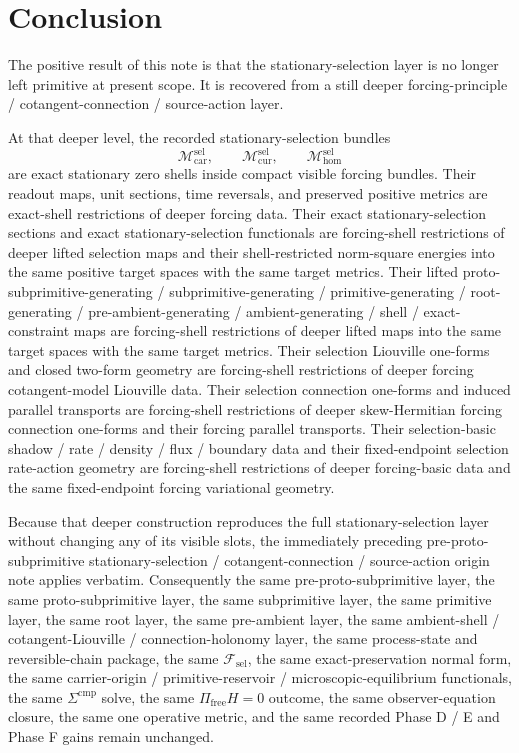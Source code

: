 \documentclass[11pt]{article}
\newcommand{\StemFunctional}{\mathscr F_{\mathrm{sel}}}
\newcommand{\Car}{\mathrm{car}}
\newcommand{\Cur}{\mathrm{cur}}
\newcommand{\Hom}{\mathrm{hom}}
\newcommand{\SelSpace}[1]{\mathcal M_{#1}^{\mathrm{sel}}}
\begin{document}
\section{Conclusion}

The positive result of this note is that the stationary-selection layer is no longer left primitive at present scope. It is recovered from a still deeper forcing-principle / cotangent-connection / source-action layer.

At that deeper level, the recorded stationary-selection bundles
\[
\SelSpace{\Car},\qquad
\SelSpace{\Cur},\qquad
\SelSpace{\Hom}
\]
are exact stationary zero shells inside compact visible forcing bundles. Their readout maps, unit sections, time reversals, and preserved positive metrics are exact-shell restrictions of deeper forcing data. Their exact stationary-selection sections and exact stationary-selection functionals are forcing-shell restrictions of deeper lifted selection maps and their shell-restricted norm-square energies into the same positive target spaces with the same target metrics. Their lifted proto-subprimitive-generating / subprimitive-generating / primitive-generating / root-generating / pre-ambient-generating / ambient-generating / shell / exact-constraint maps are forcing-shell restrictions of deeper lifted maps into the same target spaces with the same target metrics. Their selection Liouville one-forms and closed two-form geometry are forcing-shell restrictions of deeper forcing cotangent-model Liouville data. Their selection connection one-forms and induced parallel transports are forcing-shell restrictions of deeper skew-Hermitian forcing connection one-forms and their forcing parallel transports. Their selection-basic shadow / rate / density / flux / boundary data and their fixed-endpoint selection rate-action geometry are forcing-shell restrictions of deeper forcing-basic data and the same fixed-endpoint forcing variational geometry.

Because that deeper construction reproduces the full stationary-selection layer without changing any of its visible slots, the immediately preceding pre-proto-subprimitive stationary-selection / cotangent-connection / source-action origin note applies verbatim. Consequently the same pre-proto-subprimitive layer, the same proto-subprimitive layer, the same subprimitive layer, the same primitive layer, the same root layer, the same pre-ambient layer, the same ambient-shell / cotangent-Liouville / connection-holonomy layer, the same process-state and reversible-chain package, the same \(\StemFunctional\), the same exact-preservation normal form, the same carrier-origin / primitive-reservoir / microscopic-equilibrium functionals, the same \(\Sigma^{\mathrm{cmp}}\) solve, the same \(\Pi_{\mathrm{free}}H=0\) outcome, the same observer-equation closure, the same one operative metric, and the same recorded Phase D / E and Phase F gains remain unchanged.
\end{document}
